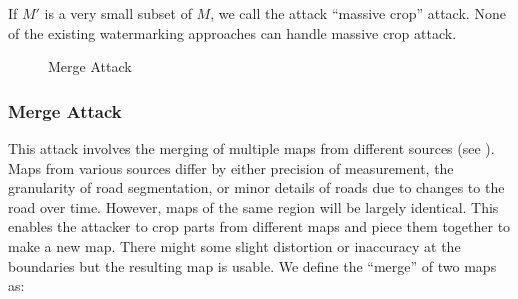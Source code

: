 If $M'$ is a very small subset of $M$, we call the attack ``massive crop'' attack.
None of the existing watermarking approaches can handle massive crop attack.

\begin{figure}[th]
\centering
{}
\caption{Merge Attack}
\label{fig:merge}
\end{figure}


\subsubsection*{Merge Attack}

This attack involves the merging of multiple maps from different sources
(see ). 
Maps from various sources differ by either precision of measurement, 
the granularity of road segmentation, 
or minor details of roads due to changes to the road
over time. However, maps of the same region will be largely identical.
This enables the attacker to crop parts from different maps and piece
them together to make a new map. There might some slight distortion or
inaccuracy at the boundaries but the resulting map is usable.
We define the ``merge'' of two maps as:

